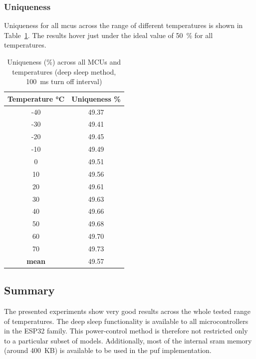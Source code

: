 \subsubsection*{Uniqueness}

Uniqueness for all \glspl{mcu} across the range of different temperatures is shown in Table~\ref{table:uniqueness_deep_sleep}. The results hover just under the ideal value of 50~\% for all temperatures.

\begin{table}[ht!]
    \centering
    \begin{tabular}{cc}
        \textbf{Temperature °C} & \textbf{Uniqueness \%} \\
    \toprule
    -40  & 49.37 \\
    -30  & 49.41 \\
    -20  & 49.45 \\
    -10  & 49.49 \\
    0    & 49.51 \\
    10   & 49.56 \\
    20   & 49.61 \\
    30   & 49.63 \\
    40   & 49.66 \\
    50   & 49.68 \\
    60   & 49.70 \\
    70   & 49.73 \\
    \textbf{mean} & 49.57 \\
    \bottomrule
    \end{tabular}
    \captionsetup{justification=centering,margin=0.5cm}
    \caption{Uniqueness (\%) across all MCUs and temperatures (deep sleep method, 100~ms turn off interval)}
    \label{table:uniqueness_deep_sleep}
    \vspace{-0.7cm}
\end{table}

\subsection{Summary}

The presented experiments show very good results across the whole tested range of temperatures. The deep sleep functionality is available to all microcontrollers in the ESP32 family. This power-control method is therefore not restricted only to a particular subset of models. Additionally, most of the internal \gls{sram} memory (around 400~KB) is available to be used in the \gls{puf} implementation.

